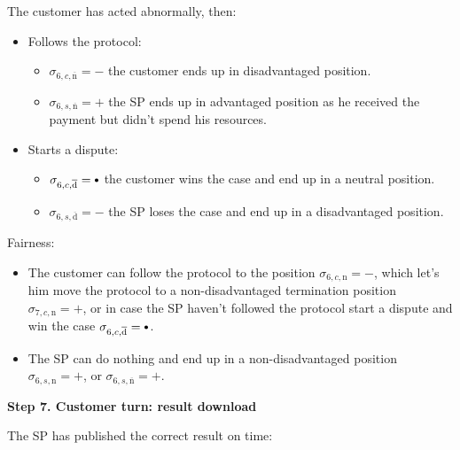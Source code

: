 \documentclass{ieeeaccess}
\newcommand\sbullet[1][.75]{\mathbin{\ThisStyle{\vcenter{\hbox{%
  \scalebox{#1}{$\SavedStyle\bullet$}}}}}%
}
\begin{document}
The customer has acted abnormally, then:

\begin{itemize}
\item
  Follows the protocol:

  \begin{itemize}
  
  \item
    \(\sigma_{6, c, \overline{\mathrm{n}}} = -\) the customer ends up in
    disadvantaged position.
  \item
    \(\sigma_{6, s, \overline{\mathrm{n}}} = +\) the SP ends up in
    advantaged position as he received the payment but didn't spend his
    resources.
  \end{itemize}
\item
  Starts a dispute:

  \begin{itemize}
  
  \item
    \(\sigma_{6, c, \overline{\mathrm{d}}} = \sbullet\) the customer wins the
    case and end up in a neutral position.
  \item
    \(\sigma_{6, s, \overline{\mathrm{d}}} = -\) the SP loses the case
    and end up in a disadvantaged position.
  \end{itemize}
\end{itemize}

Fairness:

\begin{itemize}

\item
  The customer can follow the protocol to the position
  \(\sigma_{6, c, \mathrm{n}} = -\), which let's him move the protocol
  to a non-disadvantaged termination position
  \(\sigma_{7, c, \mathrm{n}} = +\), or in case the SP haven't followed
  the protocol start a dispute and win the case
  \(\sigma_{6, c, \overline{\mathrm{d}}} = \sbullet\).
\item
  The SP can do nothing and end up in a non-disadvantaged position
  \(\sigma_{6, s, \mathrm{n}} = +\), or
  \(\sigma_{6, s, \overline{\mathrm{n}}} = +\).
\end{itemize}

\noindent \textbf
{Step 7. Customer turn: result download}\label{step-7-retrieval-of-results}

The SP has published the correct result on time:
\end{document}
